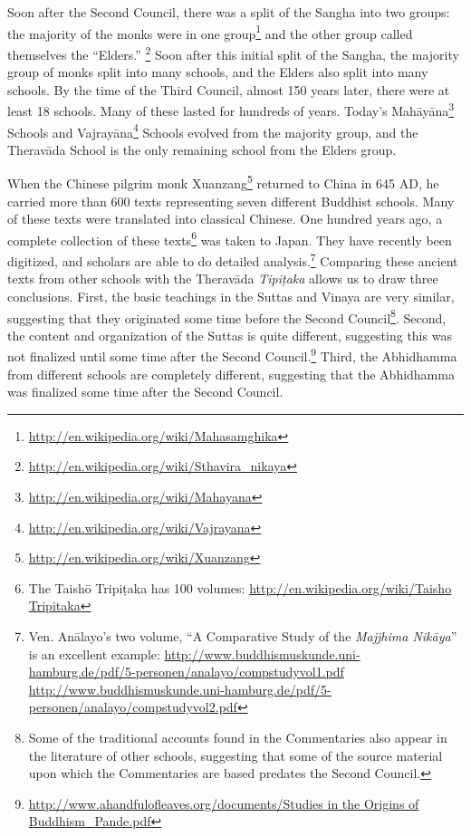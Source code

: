 Soon after the Second Council, there was a split of the Sangha into two groups: the majority of the monks were in one group\footnote{\url{http://en.wikipedia.org/wiki/Mahasamghika}} and the other group called themselves the “Elders.” \footnote{\url{http://en.wikipedia.org/wiki/Sthavira_nikaya}} Soon after this initial split of the Sangha, the majority group of monks split into many schools, and the Elders also split into many schools. By the time of the Third Council, almost 150 years later, there were at least 18 schools. Many of these lasted for hundreds of years. Today’s Mahāyāna\footnote{\url{http://en.wikipedia.org/wiki/Mahayana}} Schools and Vajrayāna\footnote{\url{http://en.wikipedia.org/wiki/Vajrayana}} Schools evolved from the majority group, and the Theravāda School is the only remaining school from the Elders group.

When the Chinese pilgrim monk Xuanzang\footnote{\url{http://en.wikipedia.org/wiki/Xuanzang}} returned to China in 645 AD, he carried more than 600 texts representing seven different Buddhist schools. Many of these texts were translated into classical Chinese. One hundred years ago, a complete collection of these texts\footnote{The Taishō Tripiṭaka has 100 volumes: \url{http://en.wikipedia.org/wiki/Taisho Tripitaka}} was taken to Japan. They have recently been digitized, and scholars are able to do detailed analysis.\footnote{Ven. Anālayo’s two volume, “A Comparative Study of the \textit{Majjhima Nikāya}” is an excellent example: \newline \url{http://www.buddhismuskunde.uni-hamburg.de/pdf/5-personen/analayo/compstudyvol1.pdf} \newline \url{http://www.buddhismuskunde.uni-hamburg.de/pdf/5-personen/analayo/compstudyvol2.pdf}} Comparing these ancient texts from other schools with the Theravāda \textit{Tipiṭaka} allows us to draw three conclusions. First, the basic teachings in the Suttas and Vinaya are very similar, suggesting that they originated some time before the Second Council\footnote{Some of the traditional accounts found in the Commentaries also appear in the literature of other schools, suggesting that some of the source material upon which the Commentaries are based predates the Second Council.}. Second, the content and organization of the Suttas is quite different, suggesting this was not finalized until some time after the Second Council.\footnote{\url{http://www.ahandfulofleaves.org/documents/Studies in the Origins of Buddhism_Pande.pdf}} Third, the Abhidhamma from different schools are completely different, suggesting that the Abhidhamma was finalized some time after the Second Council.

